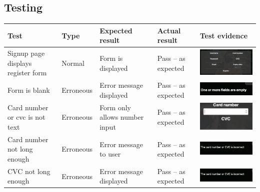 \subsection{Testing}
\begin{center}
\begin{longtable}{|P{17mm}|P{17mm}|P{16mm}|P{17mm}|P{60mm}|}
  \hline
  \textbf{Test} & \textbf{Type} & \textbf{Expected result} & \textbf{Actual result} & \textbf{Test evidence} \\
  \hline
  \endfirsthead
  \hline
  \endhead
  \hline 

  \endfoot
  \endlastfoot
Signup page displays register form & Normal & Form is displayed &
Pass -- as expected &
\includegraphics[width=58mm]{ch3_developing/proto3/media/image2.png} \\ \hline
Form is blank & Erroneous & Error message displayed & Pass -- as
expected &
\includegraphics[width=58mm]{ch3_developing/proto3/media/image3.png} \\ \hline
Card number or cvc is not text & Erroneous & Form only allows number
input & Pass -- as expected &
\includegraphics[width=58mm]{ch3_developing/proto3/media/image4.png} \\ \hline
Card number not long enough & Erroneous & Error message to user & Pass
-- as expected &
\includegraphics[width=58mm]{ch3_developing/proto3/media/image5.png} \\ \hline
CVC not long enough & Erroneous & Error message displayed & Pass -- as
expected &
\includegraphics[width=58mm]{ch3_developing/proto3/media/image5.png} \\ \hline

\end{longtable}
\end{center}
